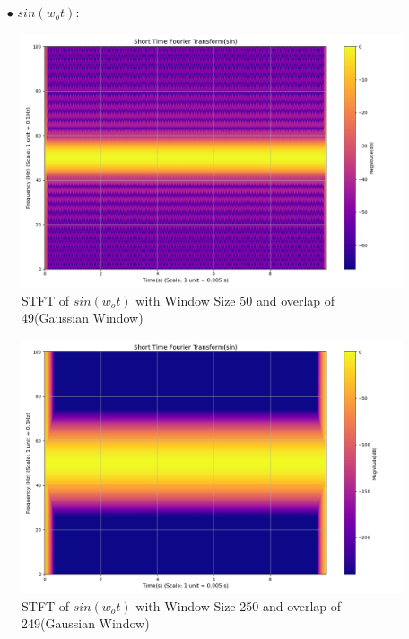 \documentclass[12pt,a4paper,onecolumn]{exam}
\begin{document}
\begin{solution}
\begin{itemize}
\begin{itemize}
    \begin{itemize}
      \item[$\bullet$] $sin(w_ot)$:
    \end{itemize}
        \begin{figure}[H]
        \centering
        \includegraphics[scale = 0.35]{Gau_Win_sin_1_50.0.png}
        \caption{STFT of $sin(w_ot)$ with Window Size 50 and overlap of 49(Gaussian Window)}
        \label{fig:13}
        \end{figure}

        \begin{figure}[H]
        \centering
        \includegraphics[scale = 0.35]{Gau_Win_sin_1_250.0.png}
        \caption{STFT of $sin(w_ot)$ with Window Size 250 and overlap of 249(Gaussian Window)}
        \label{fig:14}
        \end{figure}


\end{itemize}
\end{itemize}
\end{solution}
\end{document}

